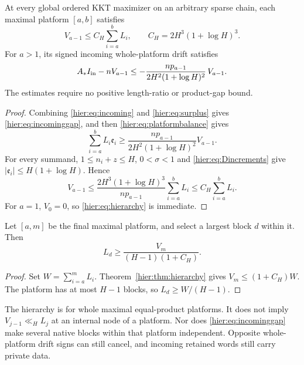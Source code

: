 \begin{theorem}\label{hier:thm:hierarchy}
At every global ordered KKT maximizer on an arbitrary sparse chain,
each maximal platform $[a,b]$ satisfies
\begin{equation}
 V_{a-1}\le C_H\sum_{i=a}^bL_i,
 \qquad C_H=2H^3(1+\log H)^3.
 \label{hier:eq:hierarchy}
\end{equation}
For $a>1$, its signed incoming whole-platform drift satisfies
\begin{equation}
 A_*I_{\rm in}-nV_{a-1}
 \le-\frac{np_{a-1}}{2H^2(1+\log H)^2}\,V_{a-1}.
 \label{hier:eq:incominggap}
\end{equation}
The estimates require no positive length-ratio or product-gap bound.
\end{theorem}
\begin{proof}
Combining \eqref{hier:eq:incoming} and \eqref{hier:eq:surplus} gives
\eqref{hier:eq:incominggap}, and then \eqref{hier:eq:platformbalance} gives
\[
 \sum_{i=a}^bL_i\mathfrak e_i
 \ge\frac{np_{a-1}}{2H^2(1+\log H)^2}V_{a-1}.
\]
For every summand, $1\le n_i+z\le H$, $0<\sigma<1$ and
\eqref{hier:eq:Dincrements} give
$|\mathfrak e_i|\le H(1+\log H)$. Hence
\[
 V_{a-1}\le
 \frac{2H^3(1+\log H)^3}{np_{a-1}}\sum_{i=a}^bL_i
 \le C_H\sum_{i=a}^bL_i.
\]
For $a=1$, $V_0=0$, so \eqref{hier:eq:hierarchy} is immediate.
\end{proof}

\begin{corollary}\label{hier:cor:longblock}
Let $[a,m]$ be the final maximal platform, and select a largest block
$d$ within it. Then
\begin{equation}
 L_d\ge\frac{V_m}{(H-1)(1+C_H)}. \label{hier:eq:longblock}
\end{equation}
\end{corollary}
\begin{proof}
Set $W=\sum_{i=a}^mL_i$. Theorem~\ref{hier:thm:hierarchy} gives
$V_m\le(1+C_H)W$. The platform has at most $H-1$ blocks, so
$L_d\ge W/(H-1)$.
\end{proof}

\begin{remark}
The hierarchy is for whole maximal equal-product platforms. It does
not imply $V_{j-1}\ll_H L_j$ at an internal node of a platform.
Nor does \eqref{hier:eq:incominggap} make several native blocks within
that platform independent. Opposite whole-platform drift signs can
still cancel, and incoming retained words still carry private data.
\end{remark}


